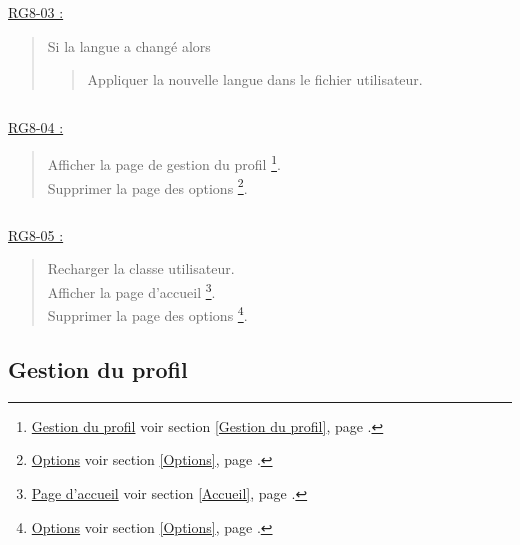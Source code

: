 \documentclass{report}
\begin{document}
			$\,$		

			\underline{RG8-03 :}
				\begin{quote}
					Si la langue a changé alors
					\begin{quote}
						Appliquer la nouvelle langue dans le fichier utilisateur.
					\end{quote}
				\end{quote}

			$\,$

			\underline{RG8-04 :}
				\begin{quote}
					Afficher la page de gestion du profil%
						\footnote[1]{
							\hyperlink{Gestion du profil}{Gestion du profil}
							\og voir section \ref{Gestion du profil}, page \pageref{Gestion du profil}.\fg
						}.\\
					Supprimer la page des options%
						\footnote[2]{
							\hyperlink{Options}{Options}
							\og voir section \ref{Options}, page \pageref{Options}.\fg
						}.						
				\end{quote}

			$\,$			
				
			\underline{RG8-05 :}
				\begin{quote}
					Recharger la classe utilisateur.\\
					Afficher la page d'accueil%
						\footnote[3]{
							\hyperlink{Page d'accueil}{Page d'accueil}
							\og voir section \ref{Accueil}, page \pageref{Accueil}.\fg
						}.\\
					Supprimer la page des options%
						\footnote[2]{
							\hyperlink{Options}{Options}
							\og voir section \ref{Options}, page \pageref{Options}.\fg
						}.		
				\end{quote}
				
\newpage

	\subsection{Gestion du profil}
	
		\hypertarget{Gestion du profil}{}
		\label{Gestion du profil}
		
		\begin{center}
			
		\end{center}
				
\end{document}
